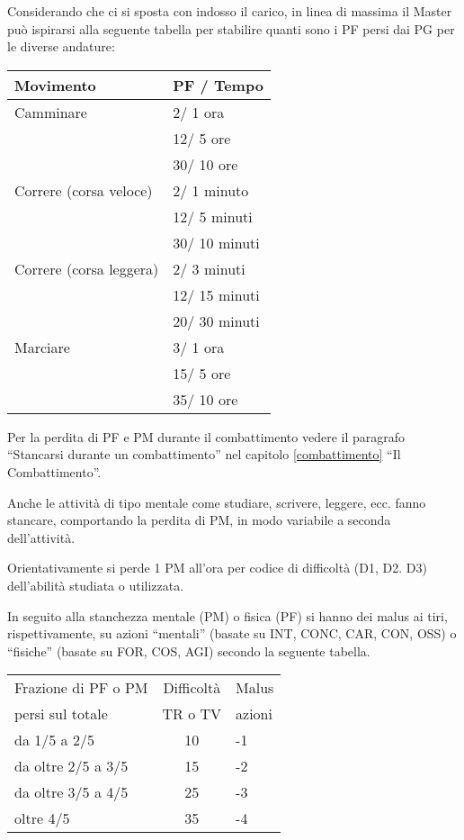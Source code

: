 Considerando che ci si sposta con indosso il carico, in linea di
massima il Master pu\`o ispirarsi alla seguente tabella per stabilire
quanti sono i PF persi dai PG per le diverse andature:

\noindent
\begin{center}
  \begin{tabular}{|l|l|}
    \hline
    Movimento& PF / Tempo \\ \hline\hline
    Camminare& 2/ 1 ora\\ 
    &12/ 5 ore\\ 
    &30/ 10 ore \\ \hline
    Correre (corsa veloce)& 2/ 1 minuto\\
    &12/ 5 minuti\\
    &30/ 10 minuti \\ \hline
    Correre (corsa leggera)& 2/ 3 minuti\\
    &12/ 15 minuti\\
    &20/ 30 minuti \\ \hline
    Marciare& 3/ 1 ora\\
    &15/ 5 ore\\
    &35/ 10 ore \\ \hline
  \end{tabular}
\end{center}

Per la perdita di PF e PM durante il combattimento vedere il paragrafo
``Stancarsi durante un combattimento'' nel capitolo
\ref{combattimento} ``Il Combattimento''.

Anche le attivit\`a di tipo mentale come studiare, scrivere,
leggere, ecc.  fanno stancare, comportando la perdita di PM, in modo
variabile a seconda dell'attivit\`a.

Orientativamente si perde 1 PM all'ora per codice di difficolt\`a
(D1, D2.  D3) dell'abilit\`a studiata o utilizzata. 


In seguito alla stanchezza mentale (PM) o fisica (PF) si hanno dei
malus ai tiri, rispettivamente, su azioni ``mentali'' (basate su INT,
CONC, CAR, CON, OSS) o ``fisiche'' (basate su FOR, COS, AGI) secondo
la seguente tabella.

\noindent
\begin{center}
\begin{tabular}{|l|c|l|}
\hline
Frazione di PF o PM& Difficolt\`a &Malus \\
persi sul totale & TR o TV & azioni \\ \hline\hline
da 1/5 a 2/5& 10& -1\\ \hline
da oltre 2/5 a 3/5& 15& -2 \\ \hline
da oltre 3/5 a 4/5& 25& -3\\ \hline
oltre 4/5& 35& -4 \\ \hline
\end{tabular}
\end{center}

